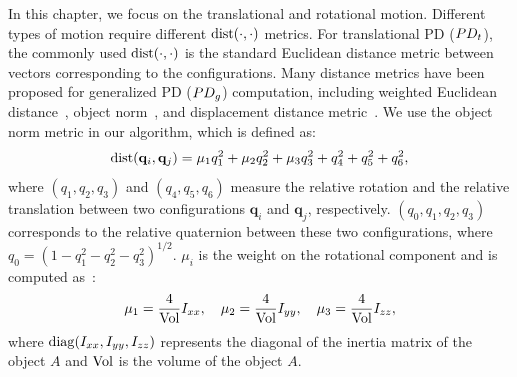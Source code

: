 In this chapter, we focus on the translational and rotational motion. Different types of motion require different $\operatorname{dist}(\cdot,\cdot)$ metrics.
For translational PD ($PD_t$), the commonly used $\operatorname{dist}(\cdot, \cdot)$ is the standard Euclidean distance metric between vectors corresponding to the configurations. Many distance metrics have been proposed for generalized PD ($PD_g$) computation, including weighted Euclidean
distance~\cite{Wang:CBO:2012}, object norm~\cite{Kazerounian:ASME:1992,Je:2012:PRP,Tang:IGP:2013}, and displacement distance metric~\cite{Zhang:2007:AFP}. We use the object norm metric in our algorithm, which is defined as:
\begin{align}
\label{eq:PDgmetric}
\operatorname{dist}(\mathbf q_i, \mathbf q_j) = \mu_1 q_1^2 + \mu_2 q_2^2 + \mu_3 q_3^2 + q_4^2 + q_5^2 + q_6^2,
\end{align}
where $(q_1, q_2, q_3)$ and $(q_4, q_5, q_6)$ measure the relative rotation and the relative translation between two configurations $\mathbf q_i$ and $\mathbf q_j$, respectively. $(q_0, q_1, q_2, q_3)$ corresponds to the relative quaternion between these two configurations, where $q_0=(1- q_1^2-q_2^2-q_3^2)^{1/2}$. $\mu_i$ is the weight on the rotational component and is computed as~\cite{Zhang:2007:AFP}:
\begin{align}
\label{eq:PDgmetricMu}
\mu_1 = \frac{4}{\vol}I_{xx}, \ \ \  \mu_2 = \frac{4}{\vol}I_{yy}, \ \ \  \mu_3 = \frac{4}{\vol}I_{zz},
\end{align}
where $\diag(I_{xx}, I_{yy}, I_{zz})$ represents the diagonal of the inertia matrix of the object $A$ and $\operatorname{Vol}$ is the volume of the object $A$. 



